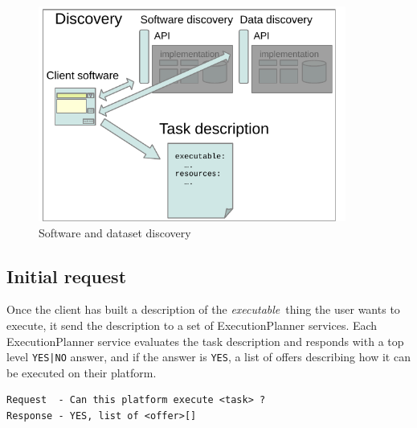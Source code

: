 \documentclass[11pt,a4paper]{ivoa}
\newcommand{\execplanner} {ExecutionPlanner}
\newcommand{\codeword}[1] {\texttt{#1}}
\newcommand{\dataset} {dataset}
\newcommand{\executablething} {\textit{executable}~thing}
\begin{document}
\begin{figure}
\centering
\includegraphics[width=0.9\textwidth]{diagrams/data-discovery.pdf}
\caption{Software and \dataset{} discovery}
\label{fig:discovery-diag}
\end{figure}

\subsection{Initial request}
\label{initial-request}

Once the client has built a description of the \executablething{} the user wants to
execute, it send the description to a set of
\execplanner{} services.
Each \execplanner{} service evaluates the task description and responds with a top level
\codeword{YES|NO} answer, and if
the answer is \codeword{YES}, a list of offers describing how it
can be executed on their platform.

\begin{lstlisting}[]
Request  - Can this platform execute <task> ?
Response - YES, list of <offer>[]
\end{lstlisting}
\end{document}
